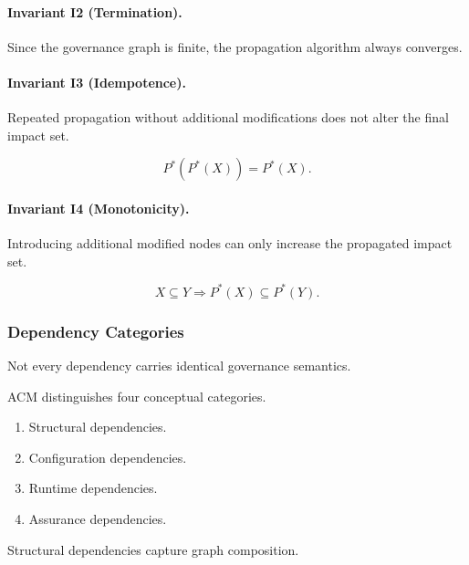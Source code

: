 \documentclass[10pt]{article}
\begin{document}
\paragraph{Invariant I2 (Termination).}

Since the governance graph is finite, the propagation algorithm always converges.

\paragraph{Invariant I3 (Idempotence).}

Repeated propagation without additional modifications does not alter the final
impact set.

\begin{equation}
P^\ast(P^\ast(X))
=
P^\ast(X).
\label{eq:prop_invariant3}
\end{equation}

\paragraph{Invariant I4 (Monotonicity).}

Introducing additional modified nodes can only increase the propagated impact
set.

\begin{equation}
X
\subseteq
Y
\Longrightarrow
P^\ast(X)
\subseteq
P^\ast(Y).
\label{eq:prop_invariant4}
\end{equation}

\subsubsection{Dependency Categories}

Not every dependency carries identical governance semantics.

ACM distinguishes four conceptual categories.

\begin{enumerate}
    \item Structural dependencies.
    \item Configuration dependencies.
    \item Runtime dependencies.
    \item Assurance dependencies.
\end{enumerate}

Structural dependencies capture graph composition.
\end{document}
